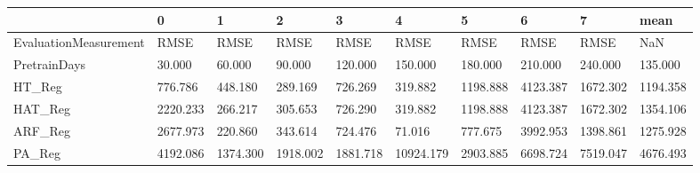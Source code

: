 \begin{tabular}{llllllllll}
\toprule
{} &        0 &        1 &        2 &        3 &         4 &        5 &        6 &        7 &     mean \\
\midrule
EvaluationMeasurement &     RMSE &     RMSE &     RMSE &     RMSE &      RMSE &     RMSE &     RMSE &     RMSE &      NaN \\
PretrainDays          &   30.000 &   60.000 &   90.000 &  120.000 &   150.000 &  180.000 &  210.000 &  240.000 &  135.000 \\
HT\_Reg                &  776.786 &  448.180 &  289.169 &  726.269 &   319.882 & 1198.888 & 4123.387 & 1672.302 & 1194.358 \\
HAT\_Reg               & 2220.233 &  266.217 &  305.653 &  726.290 &   319.882 & 1198.888 & 4123.387 & 1672.302 & 1354.106 \\
ARF\_Reg               & 2677.973 &  220.860 &  343.614 &  724.476 &    71.016 &  777.675 & 3992.953 & 1398.861 & 1275.928 \\
PA\_Reg                & 4192.086 & 1374.300 & 1918.002 & 1881.718 & 10924.179 & 2903.885 & 6698.724 & 7519.047 & 4676.493 \\
\bottomrule
\end{tabular}
